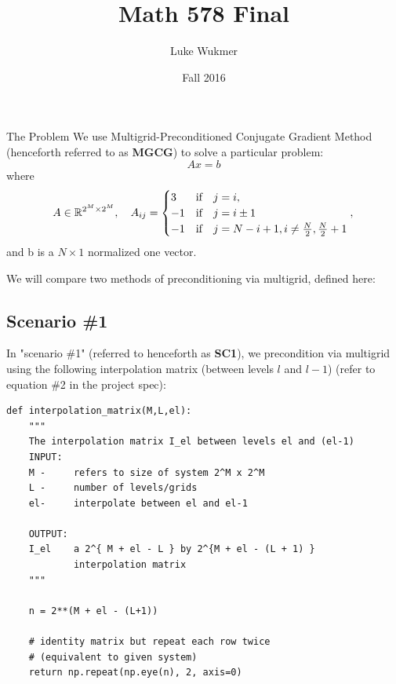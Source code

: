 \documentclass[10pt]{article}
\theoremstyle{definition}
\providecommand{\R}{\mathbb{R}}%
\begin{document}
\title{Math 578 Final}
\author{Luke Wukmer}
\date{Fall 2016}
\maketitle \thispagestyle{empty} %

\begin{section}{The Problem}
We use Multigrid-Preconditioned Conjugate Gradient Method (henceforth referred to as \textbf{MGCG}) to solve a particular problem:
\[
Ax=b
\]
where
\begin{equation}
A \in \R^{2^M \times 2^M} ,\quad A_{ij} = \begin{cases}
3 & \text{if}\quad j = i, \\
-1 & \text{if}\quad j = i \pm 1 \\
-1 & \text{if}\quad  j = N - i + 1, i \ne \frac{N}{2}, \frac{N}{2}+1
\end{cases},\\
\end{equation}
and b is a $N\times1$ normalized one vector.

We will compare two methods of preconditioning via multigrid, defined here:

\subsection{Scenario \#1}
In "scenario \#1" (referred to henceforth as \textbf{SC1}), we precondition via multigrid using the following interpolation matrix (between levels $l$ and $l-1$) (refer to equation \#2 in the project spec):

\begin{lstlisting}
def interpolation_matrix(M,L,el):
    """
    The interpolation matrix I_el between levels el and (el-1)
    INPUT:
    M -     refers to size of system 2^M x 2^M 
    L -     number of levels/grids
    el-     interpolate between el and el-1 

    OUTPUT:
    I_el    a 2^{ M + el - L } by 2^{M + el - (L + 1) }
            interpolation matrix
    """

    n = 2**(M + el - (L+1))

    # identity matrix but repeat each row twice
    # (equivalent to given system)
    return np.repeat(np.eye(n), 2, axis=0)
\end{lstlisting}
\clearpage

\end{section}
\end{document}
